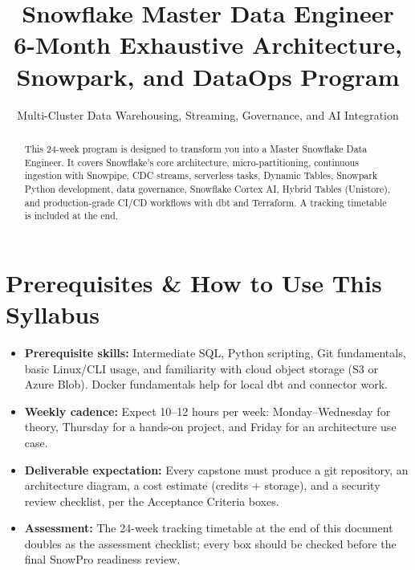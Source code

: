 \documentclass[11pt, a4paper]{article}
\title{\Huge \textbf{Snowflake Master Data Engineer}\\ \Large 6-Month Exhaustive Architecture, Snowpark, and DataOps Program}
\author{Multi-Cluster Data Warehousing, Streaming, Governance, and AI Integration}
\date{}
\begin{document}
\maketitle

\begin{abstract}
\noindent This 24-week program is designed to transform you into a Master Snowflake Data Engineer. It covers Snowflake's core architecture, micro-partitioning, continuous ingestion with Snowpipe, CDC streams, serverless tasks, Dynamic Tables, Snowpark Python development, data governance, Snowflake Cortex AI, Hybrid Tables (Unistore), and production-grade CI/CD workflows with dbt and Terraform. A tracking timetable is included at the end.
\end{abstract}

\tableofcontents
\newpage

\section*{Prerequisites \& How to Use This Syllabus}
\begin{itemize}[label=-]
    \item \textbf{Prerequisite skills:} Intermediate SQL, Python scripting, Git fundamentals, basic Linux/CLI usage, and familiarity with cloud object storage (S3 or Azure Blob). Docker fundamentals help for local dbt and connector work.
    \item \textbf{Weekly cadence:} Expect 10--12 hours per week: Monday--Wednesday for theory, Thursday for a hands-on project, and Friday for an architecture use case.
    \item \textbf{Deliverable expectation:} Every capstone must produce a git repository, an architecture diagram, a cost estimate (credits + storage), and a security review checklist, per the Acceptance Criteria boxes.
    \item \textbf{Assessment:} The 24-week tracking timetable at the end of this document doubles as the assessment checklist; every box should be checked before the final SnowPro readiness review.
\end{itemize}
\end{document}
